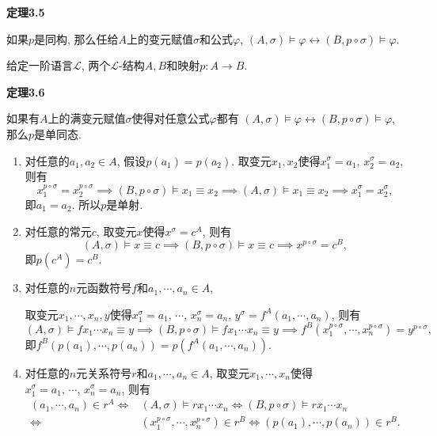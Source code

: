 \documentclass[UTF8]{ctexart}
\begin{document}
\hypertarget{sec:定理3.5}{}
\noindent\textbf{定理3.5}

如果$p$是同构, 那么任给$A$上的变元赋值$\sigma$和公式$\varphi$,
$(A,\sigma)\models\varphi\leftrightarrow(B,p\circ\sigma)\models\varphi$.





\newpage

给定一阶语言$\mathcal{L}$, 两个$\mathcal{L}$-结构$A,B$和映射$p:A\to B$.

\vspace{10pt}

\hypertarget{sec:定理3.6}{}
\noindent\textbf{定理3.6}

如果有$A$上的满变元赋值$\sigma$使得对任意公式$\varphi$都有
$(A,\sigma)\models\varphi\leftrightarrow(B,p\circ\sigma)\models\varphi$,
那么$p$是单同态.


\begin{enumerate}
    \item 对任意的$a_1,a_2\in A$, 假设$p(a_1)=p(a_2)$.
    取变元$x_1,x_2$使得$x_1^\sigma=a_1,\,x_2^\sigma=a_2$, 则有
    \[
        x_1^{p\circ\sigma}=x_2^{p\circ\sigma}\implies
        (B,p\circ\sigma)\models x_1\equiv x_2\implies
        (A,\sigma)\models x_1\equiv x_2\implies x_1^\sigma=x_2^\sigma,
    \]
    即$a_1=a_2$. 所以$p$是单射.

    \item 对任意的常元$c$, 取变元$x$使得$x^\sigma=c^A$, 则有
    \[
        (A,\sigma)\models x\equiv c\implies
        (B,p\circ\sigma)\models x\equiv c\implies
        x^{p\circ\sigma}=c^B,
    \]
    即$p(c^A)=c^B$.

    \item 对任意的$n$元函数符号$f$和$a_1,\cdots,a_n\in A$,
    
    \hspace{2.17em}
    取变元$x_1,\cdots,x_n,y$使得$x_1^\sigma=a_1,\,\cdots,\,x_n^\sigma=a_n,\,
    y^\sigma=f^A(a_1,\cdots,a_n)$, 则有
    \[
        (A,\sigma)\models fx_1\cdots x_n\equiv y\implies
        (B,p\circ\sigma)\models fx_1\cdots x_n\equiv y\implies
        f^B(x_1^{p\circ\sigma},\cdots,x_n^{p\circ\sigma})=y^{p\circ\sigma},
    \]
    即$f^B(p(a_1),\cdots,p(a_n))=p(f^A(a_1,\cdots,a_n))$.
    \item 对任意的$n$元关系符号$r$和$a_1,\cdots,a_n\in A$,
    取变元$x_1,\cdots,x_n$使得$x_1^\sigma=a_1,\,\cdots,\,x_n^\sigma=a_n$, 则有
    \begin{equation*}\begin{aligned}
        (a_1,\cdots,a_n)\in r^A\iff&(A,\sigma)\models rx_1\cdots x_n\iff
        (B,p\circ\sigma)\models rx_1\cdots x_n\\[-3pt]
        \iff&(x_1^{p\circ\sigma},\cdots,x_n^{p\circ\sigma})\in r^B\iff
        (p(a_1),\cdots,p(a_n))\in r^B.
    \end{aligned}\tag*{\qedsymbol}\end{equation*}
\end{enumerate}
\end{document}

